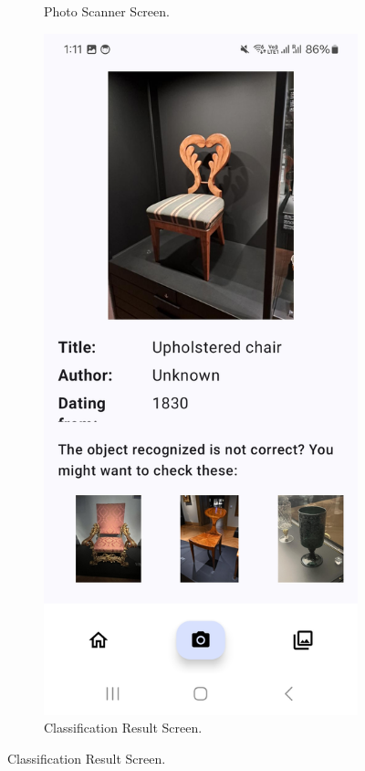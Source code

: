 \begin{figure}[h]
\begin{subfigure}[b]{0.3\textwidth}
        \caption{Photo Scanner Screen.}
    \end{subfigure}
    \hfill
    \begin{subfigure}[b]{0.3\textwidth}
        \centering
        \includegraphics[width=\textwidth]{img/classification-screen.jpg}
        \caption{Classification Result Screen.}
    \end{subfigure}


\end{figure}
